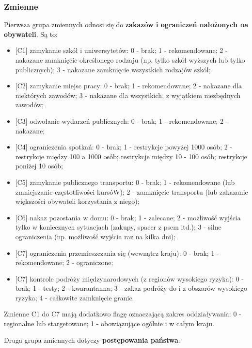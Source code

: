 \documentclass[
]{article}
\providecommand{\tightlist}{%
  \setlength{\itemsep}{0pt}\setlength{\parskip}{0pt}}
\begin{document}
\hypertarget{zmienne}{%
\subsubsection{Zmienne}\label{zmienne}}

Pierwsza grupa zmiennych odnosi się do \textbf{zakazów i ograniczeń
nałożonych na obywateli}. Są to:

\begin{itemize}
\tightlist
\item
  {[}C1{]} zamykanie szkół i uniwersytetów: 0 - brak; 1 - rekomendowane;
  2 - nakazane zamknięcie określonego rodzaju (np. tylko szkół wyższych
  lub tylko publicznych); 3 - nakazane zamknięcie wszystkich rodzajów
  szkół;
\item
  {[}C2{]} zamykanie miejsc pracy: 0 - brak; 1 - rekomendowane; 2 -
  nakazane dla niektórych zawodów; 3 - nakazane dla wszystkich, z
  wyjątkiem niezbędnych zawodów;
\item
  {[}C3{]} odwołanie wydarzeń publicznych: 0 - brak; 1 - rekomendowane;
  2 - nakazane;
\item
  {[}C4{]} ograniczenia spotkań: 0 - brak; 1 - restrykcje powyżej 1000
  osób; 2 - restrykcje między 100 a 1000 osób; restrykcje między 10 -
  100 osób; restrykcje poniżej 10 osób;
\item
  {[}C5{]} zamykanie publicznego transportu: 0 - brak; 1 - rekomendowane
  (lub zmniejszanie częstotliwości kursóW); 2 - zamknięcie transportu
  (lub zakazanie większości obywateli korzystania z niego);
\item
  {[}C6{]} nakaz pozostania w domu: 0 - brak; 1 - zalecane; 2 -
  możliwość wyjścia tylko w koniecznych sytuacjach (zakupy, spacer z
  psem itd.); 3 - silne ograniczenia (np. możliwość wyjścia raz na kilka
  dni);
\item
  {[}C7{]} ograniczenia przemieszczania się (wewnątrz kraju): 0 - brak;
  1 - rekomendowane; 2 - ograniczone;
\item
  {[}C7{]} kontrole podróży międzynarodowych (z regionów wysokiego
  ryzyka): 0 - brak; 1 - testy; 2 - kwarantanna; 3 - zakaz podróży do i
  z obszarów wysokiego ryzyka; 4 - całkowite zamknięcie granic.
\end{itemize}

Zmienne C1 do C7 mają dodatkowo flagę oznaczającą zakres oddziaływania:
0 - regionalne lub stargetowane; 1 - obowiązujące ogólnie i w całym
kraju.

Druga grupa zmiennych dotyczy \textbf{postępowania państwa}:
\end{document}
